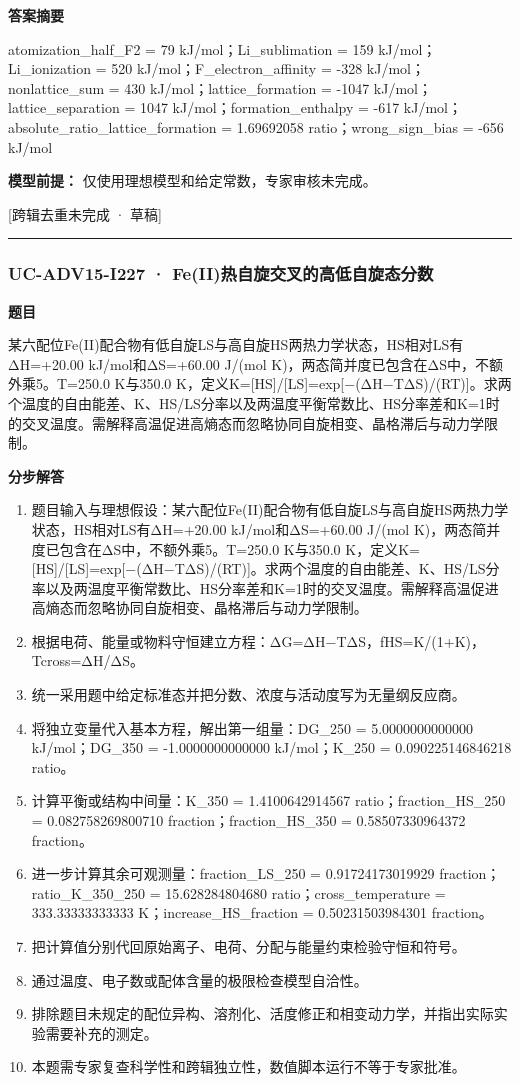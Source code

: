 \documentclass[UTF8,11pt,a4paper]{ctexart}
\begin{document}
\noindent\textbf{答案摘要}\par
atomization\_half\_F2 = 79 kJ/mol；Li\_sublimation = 159 kJ/mol；Li\_ionization = 520 kJ/mol；F\_electron\_affinity = -328 kJ/mol；nonlattice\_sum = 430 kJ/mol；lattice\_formation = -1047 kJ/mol；lattice\_separation = 1047 kJ/mol；formation\_enthalpy = -617 kJ/mol；absolute\_ratio\_lattice\_formation = 1.69692058 ratio；wrong\_sign\_bias = -656 kJ/mol\par
\noindent\textbf{模型前提：}
仅使用理想模型和给定常数，专家审核未完成。\par
\noindent\textcolor{red!65!black}{[跨辑去重未完成 · 草稿]} \par
\medskip\hrule\medskip
{}
\subsubsection*{UC-ADV15-I227 · Fe(II)热自旋交叉的高低自旋态分数}
\noindent\textbf{题目}\par
某六配位Fe(II)配合物有低自旋LS与高自旋HS两热力学状态，HS相对LS有ΔH=+20.00 kJ/mol和ΔS=+60.00 J/(mol K)，两态简并度已包含在ΔS中，不额外乘5。T=250.0 K与350.0 K，定义K=[HS]/[LS]=exp[−(ΔH−TΔS)/(RT)]。求两个温度的自由能差、K、HS/LS分率以及两温度平衡常数比、HS分率差和K=1时的交叉温度。需解释高温促进高熵态而忽略协同自旋相变、晶格滞后与动力学限制。\par
\medskip\noindent\textbf{分步解答}
\begin{enumerate}
\item 题目输入与理想假设：某六配位Fe(II)配合物有低自旋LS与高自旋HS两热力学状态，HS相对LS有ΔH=+20.00 kJ/mol和ΔS=+60.00 J/(mol K)，两态简并度已包含在ΔS中，不额外乘5。T=250.0 K与350.0 K，定义K=[HS]/[LS]=exp[−(ΔH−TΔS)/(RT)]。求两个温度的自由能差、K、HS/LS分率以及两温度平衡常数比、HS分率差和K=1时的交叉温度。需解释高温促进高熵态而忽略协同自旋相变、晶格滞后与动力学限制。
\item 根据电荷、能量或物料守恒建立方程：ΔG=ΔH−TΔS，fHS=K/(1+K)，Tcross=ΔH/ΔS。
\item 统一采用题中给定标准态并把分数、浓度与活动度写为无量纲反应商。
\item 将独立变量代入基本方程，解出第一组量：DG\_250 = 5.0000000000000 kJ/mol；DG\_350 = -1.0000000000000 kJ/mol；K\_250 = 0.090225146846218 ratio。
\item 计算平衡或结构中间量：K\_350 = 1.4100642914567 ratio；fraction\_HS\_250 = 0.082758269800710 fraction；fraction\_HS\_350 = 0.58507330964372 fraction。
\item 进一步计算其余可观测量：fraction\_LS\_250 = 0.91724173019929 fraction；ratio\_K\_350\_250 = 15.628284804680 ratio；cross\_temperature = 333.33333333333 K；increase\_HS\_fraction = 0.50231503984301 fraction。
\item 把计算值分别代回原始离子、电荷、分配与能量约束检验守恒和符号。
\item 通过温度、电子数或配体含量的极限检查模型自洽性。
\item 排除题目未规定的配位异构、溶剂化、活度修正和相变动力学，并指出实际实验需要补充的测定。
\item 本题需专家复查科学性和跨辑独立性，数值脚本运行不等于专家批准。
\end{enumerate}
\end{document}
